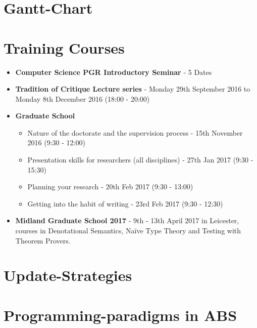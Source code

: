 \begin{appendices}

\chapter{Gantt-Chart}
\label{app:gantt}



\chapter{Training Courses}
\label{app:courses}

\begin{itemize}
\item \textbf{Computer Science PGR Introductory Seminar} - 5 Dates
\item \textbf{Tradition of Critique Lecture series} - Monday 29th September 2016 to Monday 8th December 2016 (18:00 - 20:00)
\item \textbf{Graduate School}
	\begin{itemize}	
		\item Nature of the doctorate and the supervision process - 15th November 2016 (9:30 - 12:00)
		\item Presentation skills for researchers (all disciplines) - 27th Jan 2017 (9:30 - 15:30)
		\item Planning your research - 20th Feb 2017 (9:30 - 13:00)
		\item Getting into the habit of writing - 23rd Feb 2017 (9:30 - 12:30)
	\end{itemize}
\item \textbf{Midland Graduate School 2017} - 9th - 13th April 2017 in Leicester, courses in Denotational Semantics, Naïve Type Theory and Testing with Theorem Provers.
\end{itemize}

\chapter{Update-Strategies}
\label{app:updateStrategies}


\chapter{Programming-paradigms in ABS}
\label{app:paradigms}




\end{appendices}